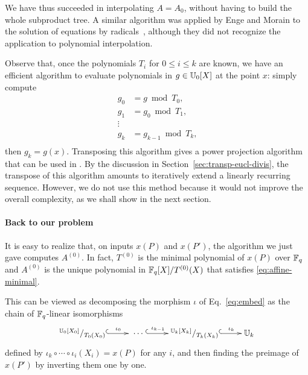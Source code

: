  We have thus succeeded
in interpolating $A=A_0$, without having to build the whole subproduct
tree. A similar algorithm was applied by Enge and Morain to the
solution of equations by radicals~\cite{enge+morain03}, although they
did not recognize the application to polynomial interpolation.

\begin{remark}
  Observe that, once the polynomials $T_i$ for $0\le i\le k$ are
  known, we have an efficient algorithm to evaluate polynomials in
  $g\in\mathbb{U}_0[X]$ at the point $x$: simply compute
  \begin{equation}
    \label{eq:191}
    \begin{aligned}
      g_0 &= g\bmod T_0\text{,}\\
      g_1 &= g_0\bmod T_1\text{,}\\
      \vdots\\
      g_k &= g_{k-1}\bmod T_k\text{,}\\
    \end{aligned}
  \end{equation}
  then $g_k=g(x)$. Transposing this algorithm gives a power projection
  algorithm that can be used in . By the discussion in
  Section~\ref{sec:transp-eucl-divis}, the
  transpose of this algorithm
  amounts to iteratively extend a linearly recurring
  sequence. However, we do not use this method because it would not
  improve the overall complexity, as we shall show in the next
  section.
\end{remark}


\paragraph{Back to our problem}
It is easy to realize that, on inputs $x(P)$ and $x(P')$, the
algorithm we just gave computes $A^{(0)}$. In fact, $T^{(0)}$ is
the minimal polynomial of $x(P)$ over $\mathbb{F}_q$ and $A^{(0)}$ is the
unique polynomial in $\mathbb{F}_q[X]/T^{(0)}(X)$ that satisfies
\eqref{eq:affine-minimal}.

This can be viewed as decomposing the morphism $\iota$ of
Eq.~\eqref{eq:embed} as the chain of $\mathbb{F}_q$-linear isomorphisms
\begin{equation}
  \xymatrix{
    ^{\U_0[X_0]}/_{T_0(X_0)} \ar@{^{(}->}[r]^-{\iota_0} &
    \;\cdots\; \ar@{^{(}->}[r]^-{\iota_{k-1}} &
    ^{\U_k[X_k]}/_{T_k(X_k)} \ar@{^{(}->}[r]^-{\iota_k} &
    \U_k
  }
\end{equation}
defined by $\iota_k\circ\cdots\circ\iota_i(X_i) = x(P)$ for any $i$,
and then finding the preimage of $x(P')$ by inverting them one by
one.

